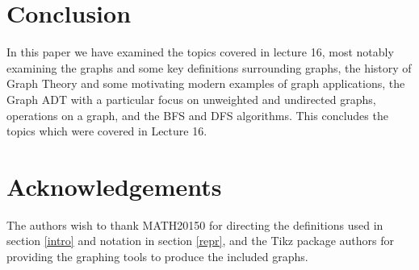 \documentclass[11pt,reqno]{amsart}
\theoremstyle{definition}
\numberwithin{equation}{section}
\begin{document}
\section{Conclusion}
\noindent In this paper we have examined the topics covered in lecture 16, most notably examining the graphs and some key definitions surrounding graphs, the history of Graph Theory and some motivating modern examples of graph applications, the Graph ADT with a particular focus on unweighted and undirected graphs, operations on a graph, and the BFS and DFS algorithms. This concludes the topics which were covered in Lecture 16.

\section{Acknowledgements}
\noindent The authors wish to thank MATH20150 for directing the definitions used in section \ref{intro} and notation in section \ref{repr}, and the Tikz package authors for providing the graphing tools to produce the included graphs.
\end{document}
